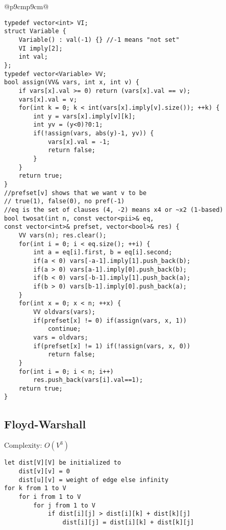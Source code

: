 \documentclass[letterpaper]{article}
\begin{document}
\begin{tabular}{@{}p{9cm}p{9cm}@{}}
\begin{lstlisting}
typedef vector<int> VI;
struct Variable {
	Variable() : val(-1) {} //-1 means "not set"
	VI imply[2];
	int val;
};
typedef vector<Variable> VV;
bool assign(VV& vars, int x, int v) {
	if vars[x].val >= 0) return (vars[x].val == v);
	vars[x].val = v;
	for(int k = 0; k < int(vars[x].imply[v].size()); ++k) {
		int y = vars[x].imply[v][k];
		int yv = (y<0)?0:1;
		if(!assign(vars, abs(y)-1, yv)) {
			vars[x].val = -1;
			return false;
		}
	}
	return true;
}
//prefset[v] shows that we want v to be 
// true(1), false(0), no pref(-1)
//eq is the set of clauses (4, -2) means x4 or ~x2 (1-based)
bool twosat(int n, const vector<pii>& eq, 
const vector<int>& prefset, vector<bool>& res) {
	VV vars(n); res.clear();
	for(int i = 0; i < eq.size(); ++i) {
		int a = eq[i].first, b = eq[i].second;
		if(a < 0) vars[-a-1].imply[1].push_back(b);
		if(a > 0) vars[a-1].imply[0].push_back(b);
		if(b < 0) vars[-b-1].imply[1].push_back(a);
		if(b > 0) vars[b-1].imply[0].push_back(a);
	}
	for(int x = 0; x < n; ++x) {
		VV oldvars(vars);
		if(prefset[x] != 0) if(assign(vars, x, 1))
			continue;
		vars = oldvars;
		if(prefset[x] != 1) if(!assign(vars, x, 0))
			return false;
	}
	for(int i = 0; i < n; i++)
		res.push_back(vars[i].val==1);
	return true;
}
\end{lstlisting}

\subsection{Floyd-Warshall}

Complexity: $O\left(V^3\right)$

\begin{lstlisting}
let dist[V][V] be initialized to
	dist[v][v] = 0
	dist[u][v] = weight of edge else infinity
for k from 1 to V
	for i from 1 to V
		for j from 1 to V
			if dist[i][j] > dist[i][k] + dist[k][j]
				dist[i][j] = dist[i][k] + dist[k][j]
\end{lstlisting}
\end{tabular}
\clearpage
\vspace*{-3em}
\end{document}
